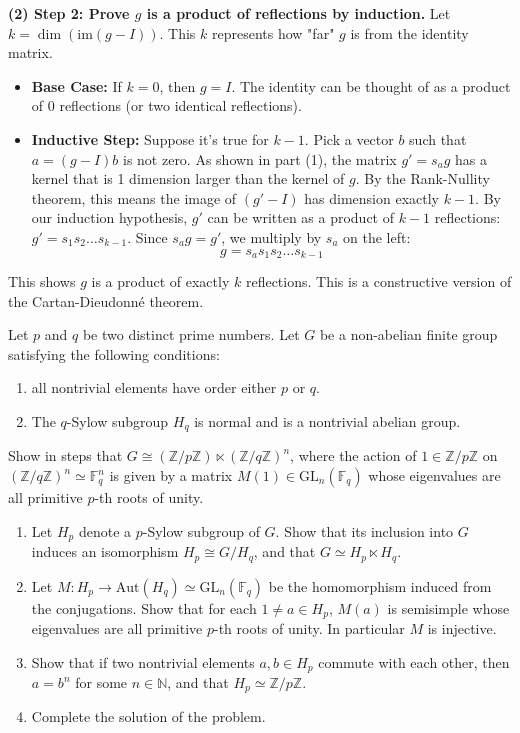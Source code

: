 \begin{solution}
\textbf{(2) Step 2: Prove $g$ is a product of reflections by induction.}
Let $k = \dim(\text{im}(g-I))$. This $k$ represents how "far" $g$ is from the identity matrix.
\begin{itemize}
    \item \textbf{Base Case:} If $k=0$, then $g = I$. The identity can be thought of as a product of 0 reflections (or two identical reflections).
    \item \textbf{Inductive Step:} Suppose it's true for $k-1$.
    Pick a vector $b$ such that $a = (g-I)b$ is not zero.
    As shown in part (1), the matrix $g' = s_a g$ has a kernel that is 1 dimension larger than the kernel of $g$.
    By the Rank-Nullity theorem, this means the image of $(g'-I)$ has dimension exactly $k-1$.
    By our induction hypothesis, $g'$ can be written as a product of $k-1$ reflections: $g' = s_1 s_2 \dots s_{k-1}$.
    Since $s_a g = g'$, we multiply by $s_a$ on the left:
    \[ g = s_a s_1 s_2 \dots s_{k-1} \]
\end{itemize}
This shows $g$ is a product of exactly $k$ reflections. This is a constructive version of the Cartan-Dieudonn\'e theorem.
\end{solution}

\begin{exercise}
\label{algebra:2015:7}
Let $p$ and $q$ be two distinct prime numbers. Let $G$ be a non-abelian finite group satisfying the following conditions:
\begin{enumerate}
    \item all nontrivial elements have order either $p$ or $q$.
    \item The $q$-Sylow subgroup $H_q$ is normal and is a nontrivial abelian group.
\end{enumerate}
Show in steps that $G \cong (\mathbb{Z}/p\mathbb{Z}) \ltimes (\mathbb{Z}/q\mathbb{Z})^n$, where the action of $1 \in \mathbb{Z}/p\mathbb{Z}$ on $(\mathbb{Z}/q\mathbb{Z})^n \simeq \mathbb{F}_q^n$ is given by a matrix $M(1) \in \mathrm{GL}_n(\mathbb{F}_q)$ whose eigenvalues are all primitive $p$-th roots of unity.
\begin{enumerate}
    \item Let $H_p$ denote a $p$-Sylow subgroup of $G$. Show that its inclusion into $G$ induces an isomorphism $H_p \cong G / H_q$, and that $G \simeq H_p \ltimes H_q$.
    \item Let $M : H_p \to \mathrm{Aut}(H_q) \simeq \mathrm{GL}_n(\mathbb{F}_q)$ be the homomorphism induced from the conjugations. Show that for each $1 \neq a \in H_p$, $M(a)$ is semisimple whose eigenvalues are all primitive $p$-th roots of unity. In particular $M$ is injective.
    \item Show that if two nontrivial elements $a, b \in H_p$ commute with each other, then $a = b^n$ for some $n \in \mathbb{N}$, and that $H_p \simeq \mathbb{Z}/p\mathbb{Z}$.
    \item Complete the solution of the problem.
\end{enumerate}
\end{exercise}

